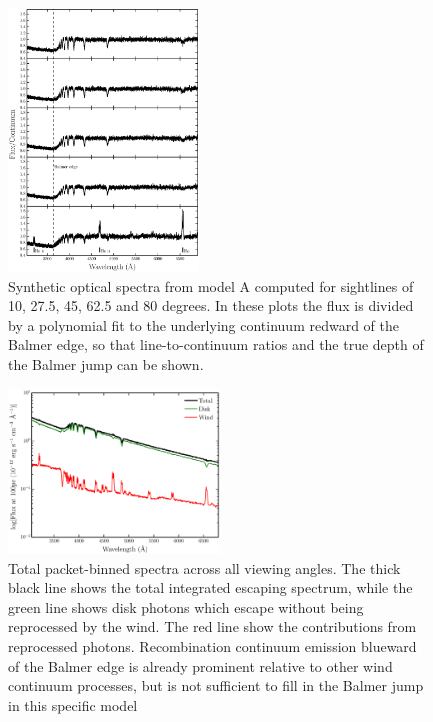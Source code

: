 \documentclass[preprint, a4paper, 11pt]{aastex}
\begin{document}
\begin{figure} 
\includegraphics[width=0.45\textwidth]{figures/modela_opt_cont.eps}
\caption{Synthetic optical spectra from model A computed for 
sightlines of 10, 27.5, 45, 62.5 and 80 degrees. In these plots
the flux is divided by a polynomial fit to the 
underlying continuum redward of the Balmer edge, so that 
line-to-continuum ratios and the true depth of the
Balmer jump can be shown.}
\label{spec_continuum}
\end{figure} 

\begin{figure} 
\includegraphics[width=0.5\textwidth]{figures/modela_escaping.eps}
\caption{Total packet-binned spectra across all viewing angles. 
The thick black line shows the total 
integrated escaping spectrum, 
while the green line shows disk photons which escape without being reprocessed by
the wind. The red line show the contributions from reprocessed photons. 
Recombination continuum emission blueward of the Balmer 
edge is already prominent relative to other wind continuum processes, but is not sufficient
to fill in the Balmer jump in this specific model}
\label{cont}
\end{figure} 


\newpage
\end{document}
